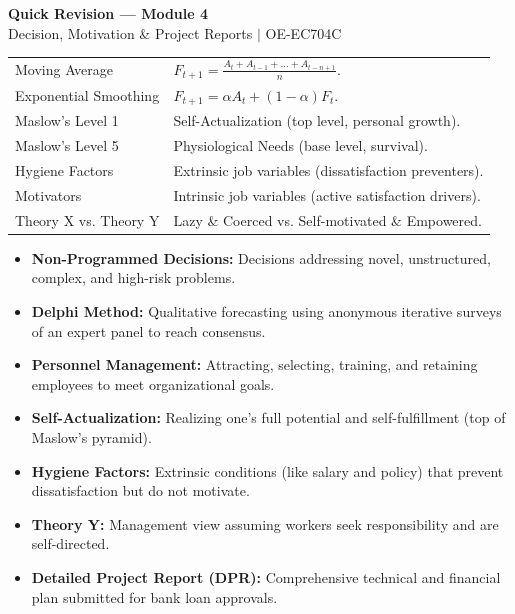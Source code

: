 \documentclass[12pt,a4paper]{article}
\renewcommand{\arraystretch}{1.45}
\begin{document}
\newpage

\begin{center}
  {\large\bfseries\color{myred} Quick Revision --- Module 4}\\[3pt]
  {\small\color{mydark} Decision, Motivation \& Project Reports $|$ OE-EC704C}
\end{center}
\noindent{\color{myred}\rule{\linewidth}{1.2pt}}
\vspace{4pt}

\begin{tcolorbox}[formulabox, title={\textbf{Key Concepts \& Equations}}]
\renewcommand{\arraystretch}{1.3}
\begin{tabularx}{\linewidth}{B{4.0cm} X}
Moving Average & $F_{t+1} = \frac{A_t + A_{t-1} + \dots + A_{t-n+1}}{n}$. \\
Exponential Smoothing & $F_{t+1} = \alpha A_t + (1 - \alpha) F_t$. \\
Maslow's Level 1 & Self-Actualization (top level, personal growth). \\
Maslow's Level 5 & Physiological Needs (base level, survival). \\
Hygiene Factors & Extrinsic job variables (dissatisfaction preventers). \\
Motivators & Intrinsic job variables (active satisfaction drivers). \\
Theory X vs. Theory Y & Lazy \& Coerced vs. Self-motivated \& Empowered. \\
\end{tabularx}
\end{tcolorbox}

\begin{tcolorbox}[defbox, title={\textbf{One-Line Definitions}}]
\begin{itemize}[leftmargin=*, itemsep=2.5pt, topsep=0pt]
  \item \textbf{Non-Programmed Decisions:} Decisions addressing novel, unstructured, complex, and high-risk problems.
  \item \textbf{Delphi Method:} Qualitative forecasting using anonymous iterative surveys of an expert panel to reach consensus.
  \item \textbf{Personnel Management:} Attracting, selecting, training, and retaining employees to meet organizational goals.
  \item \textbf{Self-Actualization:} Realizing one's full potential and self-fulfillment (top of Maslow's pyramid).
  \item \textbf{Hygiene Factors:} Extrinsic conditions (like salary and policy) that prevent dissatisfaction but do not motivate.
  \item \textbf{Theory Y:} Management view assuming workers seek responsibility and are self-directed.
  \item \textbf{Detailed Project Report (DPR):} Comprehensive technical and financial plan submitted for bank loan approvals.
\end{itemize}
\end{tcolorbox}
\end{document}
